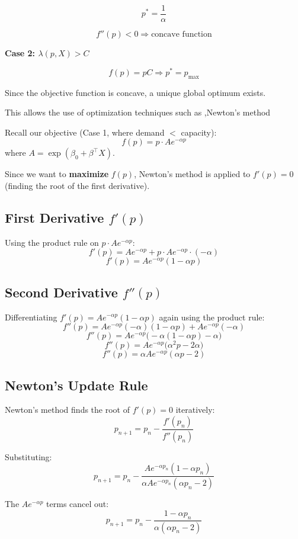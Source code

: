 \documentclass[12pt]{article}
\begin{document}
\[
p^* = \frac{1}{\alpha}
\]

\[
f''(p) < 0 \Rightarrow \text{concave function}
\]

\textbf{Case 2: $\lambda(p,X) > C$}

\[
f(p) = pC \Rightarrow p^* = p_{\max}
\]

Since the objective function is concave, a unique global optimum exists.

This allows the use of optimization techniques such as ,Newton's method



Recall our objective (Case 1, where demand $<$ capacity):
\[
f(p) = p \cdot A e^{-\alpha p}
\]
where $A = \exp(\beta_0 + \beta^\top X)$.

Since we want to \textbf{maximize} $f(p)$, Newton's method is applied to 
$f'(p) = 0$ (finding the root of the first derivative).

\subsection*{First Derivative $f'(p)$}

Using the product rule on $p \cdot Ae^{-\alpha p}$:
\[
f'(p) = Ae^{-\alpha p} + p \cdot Ae^{-\alpha p} \cdot (-\alpha)
\]
\[
f'(p) = Ae^{-\alpha p}(1 - \alpha p)
\]

\subsection*{Second Derivative $f''(p)$}

Differentiating $f'(p) = Ae^{-\alpha p}(1 - \alpha p)$ again using the product rule:
\[
f''(p) = Ae^{-\alpha p}(-\alpha)(1 - \alpha p) + Ae^{-\alpha p}(-\alpha)
\]
\[
f''(p) = Ae^{-\alpha p}\Big(-\alpha(1 - \alpha p) - \alpha\Big)
\]
\[
f''(p) = Ae^{-\alpha p}\Big(\alpha^2 p - 2\alpha\Big)
\]
\[
f''(p) = \alpha A e^{-\alpha p}(\alpha p - 2)
\]

\subsection*{Newton's Update Rule}

Newton's method finds the root of $f'(p) = 0$ iteratively:
\[
p_{n+1} = p_n - \frac{f'(p_n)}{f''(p_n)}
\]

Substituting:
\[
p_{n+1} = p_n - \frac{Ae^{-\alpha p_n}(1 - \alpha p_n)}{\alpha A e^{-\alpha p_n}(\alpha p_n - 2)}
\]

The $Ae^{-\alpha p}$ terms cancel out:
\[
\boxed{p_{n+1} = p_n - \frac{1 - \alpha p_n}{\alpha(\alpha p_n - 2)}}
\]
\end{document}
